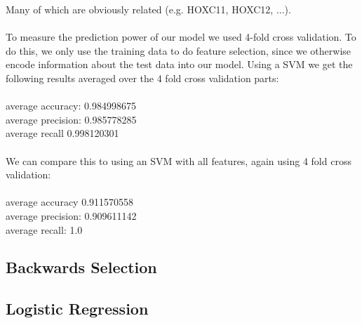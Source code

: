 \documentclass[11pt]{article}
\begin{document}
Many of which are obviously related (e.g. HOXC11, HOXC12, ...).\\\\
To measure the prediction power of our model we used 4-fold cross validation. To do this, we only use the training data to do feature selection, since we otherwise encode information about the test data into our model. Using a SVM we get the following results averaged over the 4 fold cross validation parts:\\\\
average accuracy: 0.984998675\\
average precision: 0.985778285\\
average recall 0.998120301\\\\
We can compare this to using an SVM with all features, again using 4 fold cross validation:\\\\
average accuracy 0.911570558\\
average precision: 0.909611142\\
average recall: 1.0\\
\subsection{Backwards Selection}
\subsection{Logistic Regression}
\end{document}
